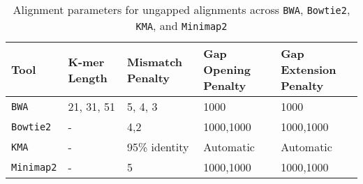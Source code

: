 \documentclass[11pt]{report}
\begin{document}
\begin{table}[h!]
	\centering
	\begin{adjustbox}{max width=\linewidth}
		\begin{tabular}{|p{2.5cm}|p{2.5cm}|p{2.5cm}|p{2.5cm}|p{2.5cm}|}
			\hline
			\textbf{Tool} & \textbf{K-mer Length} & \textbf{Mismatch Penalty} & \textbf{Gap Opening Penalty} & \textbf{Gap Extension Penalty} \\ \hline
			\texttt{BWA} & 21, 31, 51 & 5, 4, 3 & 1000 & 1000 \\ \hline
			\texttt{Bowtie2} & - & 4,2 & 1000,1000 & 1000,1000 \\ \hline
			\texttt{KMA} & - & 95\% identity & Automatic & Automatic \\ \hline
			\texttt{Minimap2} & - & 5 & 1000,1000 & 1000,1000 \\ \hline
		\end{tabular}
	\end{adjustbox}
	\caption{Alignment parameters for ungapped alignments across \texttt{BWA}, \texttt{Bowtie2}, \texttt{KMA}, and \texttt{Minimap2}}
	\label{tab:alignment_parameters}
\end{table}
	
\end{document}
